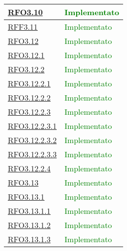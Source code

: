 \begin{longtable}{|>{\centering}m{5cm}|m{5cm}<{\centering}|}
\hyperlink{RFO3.10}{RFO3.10} &   \textcolor{green}{Implementato}\\ \hline

\hyperlink{RFF3.11}{RFF3.11} &  \textcolor{green}{Implementato}\\ \hline

\hyperlink{RFO3.12}{RFO3.12} &  \textcolor{green}{Implementato}\\ \hline

\hyperlink{RFO3.12.1}{RFO3.12.1} & \textcolor{green}{Implementato}\\ \hline

\hyperlink{RFO3.12.2}{RFO3.12.2} & \textcolor{green}{Implementato}\\ \hline

\hyperlink{RFO3.12.2.1}{RFO3.12.2.1} & \textcolor{green}{Implementato}\\ \hline

\hyperlink{RFO3.12.2.2}{RFO3.12.2.2} &  \textcolor{green}{Implementato}\\ \hline

\hyperlink{RFO3.12.2.3}{RFO3.12.2.3} & \textcolor{green}{Implementato}\\ \hline

\hyperlink{RFO3.12.2.3.1}{RFO3.12.2.3.1} & \textcolor{green}{Implementato}\\ \hline

\hyperlink{RFO3.12.2.3.2}{RFO3.12.2.3.2} & \textcolor{green}{Implementato}\\ \hline

\hyperlink{RFO3.12.2.3.3}{RFO3.12.2.3.3} &  \textcolor{green}{Implementato}\\ \hline

\hyperlink{RFO3.12.2.4}{RFO3.12.2.4} &  \textcolor{green}{Implementato}\\ \hline

\hyperlink{RFO3.13}{RFO3.13} & \textcolor{green}{Implementato}\\ \hline

\hyperlink{RFO3.13.1}{RFO3.13.1} & \textcolor{green}{Implementato}\\ \hline

\hyperlink{RFO3.13.1.1}{RFO3.13.1.1} &  \textcolor{green}{Implementato}\\ \hline

\hyperlink{RFO3.13.1.2}{RFO3.13.1.2} & \textcolor{green}{Implementato}\\ \hline

\hyperlink{RFO3.13.1.3}{RFO3.13.1.3} &  \textcolor{green}{Implementato}\\ \hline


\end{longtable}
